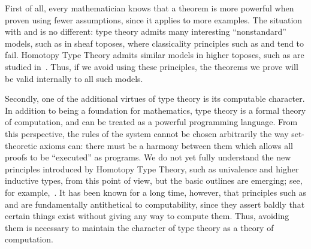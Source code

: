 First of all, every mathematician knows that a theorem is more powerful when proven using fewer assumptions, since it applies to more examples.
The situation with \choice{} and \LEM{} is no different:
type theory admits many interesting ``nonstandard'' models, such as in sheaf toposes, where classicality principles such as \choice{} and \LEM{} tend to fail.
Homotopy Type Theory admits similar models in higher toposes, such as are studied in~\cite{ToenVezzosi02,Rezk05,lurie:higher-topoi}.
Thus, if we avoid using these principles, the theorems we prove will be valid internally to all such models.

Secondly, one of the additional virtues of type theory is its computable character.
In addition to being a foundation for mathematics, type theory is a formal theory of computation, and can be treated as a powerful programming language.
%
From this perspective, the rules of the system cannot be chosen arbitrarily the way set-theoretic axioms can: there must be a harmony between them which allows all proofs to be ``executed'' as programs.
We do not yet fully understand the new principles introduced by Homotopy Type Theory, such as univalence and higher inductive types, from
this point of view, but the basic outlines are emerging; see, for example,~\cite{lh:canonicity}.
It has been known for a long time, however, that principles such as \choice{} and \LEM{} are fundamentally antithetical to computability, since they assert baldly that certain things exist without giving any way to compute them.
Thus, avoiding them is necessary to maintain the character of type theory as a theory of computation.

